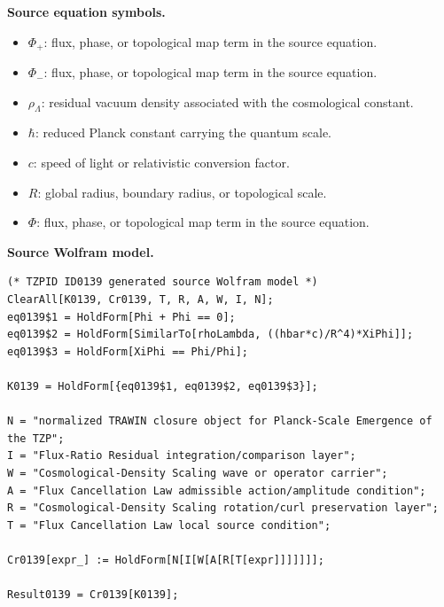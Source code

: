 \begin{minipage}[t]{0.49\linewidth}
\begingroup
\small
\raggedright
\textbf{Source equation symbols.}\par
\begin{itemize}[leftmargin=1.35em,itemsep=1pt,topsep=1pt,parsep=0pt]
    \item $\Phi_{+}$: flux, phase, or topological map term in the source equation.
    \item $\Phi_{-}$: flux, phase, or topological map term in the source equation.
    \item $\rho_{\Lambda}$: residual vacuum density associated with the cosmological constant.
    \item $\hbar$: reduced Planck constant carrying the quantum scale.
    \item $c$: speed of light or relativistic conversion factor.
    \item $R$: global radius, boundary radius, or topological scale.
    \item $\Phi$: flux, phase, or topological map term in the source equation.
\end{itemize}
\endgroup
\end{minipage}\hfill
\begin{minipage}[t]{0.47\linewidth}
\begingroup
\scriptsize
\raggedright
\textbf{Source Wolfram model.}\par
\begin{Verbatim}[fontsize=\tiny,breaklines=true,breakanywhere=true]
(* TZPID ID0139 generated source Wolfram model *)
ClearAll[K0139, Cr0139, T, R, A, W, I, N];
eq0139$1 = HoldForm[Phi + Phi == 0];
eq0139$2 = HoldForm[SimilarTo[rhoLambda, ((hbar*c)/R^4)*XiPhi]];
eq0139$3 = HoldForm[XiPhi == Phi/Phi];

K0139 = HoldForm[{eq0139$1, eq0139$2, eq0139$3}];

N = "normalized TRAWIN closure object for Planck-Scale Emergence of the TZP";
I = "Flux-Ratio Residual integration/comparison layer";
W = "Cosmological-Density Scaling wave or operator carrier";
A = "Flux Cancellation Law admissible action/amplitude condition";
R = "Cosmological-Density Scaling rotation/curl preservation layer";
T = "Flux Cancellation Law local source condition";

Cr0139[expr_] := HoldForm[N[I[W[A[R[T[expr]]]]]]];

Result0139 = Cr0139[K0139];
\end{Verbatim}
\endgroup
\end{minipage}

